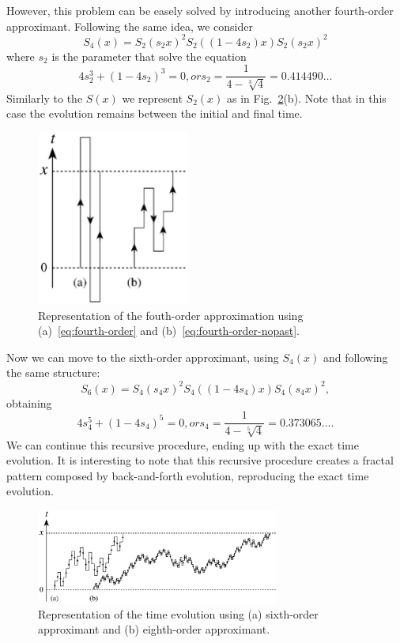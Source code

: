 However, this problem can be easely solved by introducing another fourth-order approximant. Following the same idea, we consider
\begin{equation} \label{eq:fourth-order-nopast}
S_4(x) = S_2(s_2x)^2 S_2((1-4s_2)x) S_2(s_2x)^2	
\end{equation}
where $s_2$ is the parameter that solve the equation
\begin{equation}
4s_2^3 + (1-4s_2)^3 = 0, or s_2 = \frac{1}{4 - \sqrt[3]{4}}=0.414490\ldots
\end{equation}
Similarly to the $S(x)$ we represent $S_2(x)$ as in Fig.~\ref{plot:fractal-evolution}(b). Note that in this case the evolution remains between the initial and final time.
\begin{figure}
   \centering
   \includegraphics[width=5cm]{Plots/evolution.eps}
   \caption{Representation of the fouth-order approximation using (a)~\eqref{eq:fourth-order} and (b)~\eqref{eq:fourth-order-nopast}.} \label{plot:evolution}
\end{figure}


Now we can move to the sixth-order approximant, using $S_4(x)$ and following the same structure:
\begin{equation} \label{eq:sixth-order}
S_6(x) = S_4(s_4x)^2 S_4((1-4s_4)x) S_4(s_4x)^2,
\end{equation}
obtaining
\begin{equation}
4s_4^5 + (1-4s_4)^5 = 0, or s_4 = \frac{1}{4-\sqrt[5]{4}} = 0.373065\ldots .
\end{equation}
We can continue this recursive procedure, ending up with the exact time evolution. It is interesting to note that this recursive procedure creates a fractal pattern composed by back-and-forth evolution, reproducing the exact time evolution.
\begin{figure}
  \centering
   \includegraphics[width=8cm]{Plots/fractal_evolution.eps}
   \caption{Representation of the time evolution using (a) sixth-order approximant and (b) eighth-order approximant.} \label{plot:fractal-evolution}
\end{figure}

